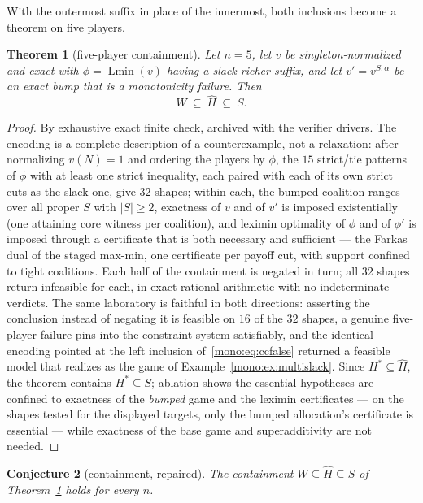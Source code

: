 \documentclass[11pt]{article}
\newtheorem{theorem}{Theorem}
\newtheorem{conjecture}[theorem]{Conjecture}
\newcommand{\Lmin}{\operatorname{Lmin}}
\begin{document}
With the outermost suffix in place of the innermost, both inclusions become
a theorem on five players.

\begin{theorem}[five-player containment]\label{mono:thm:cchat}
Let $n=5$, let $v$ be singleton-normalized and exact with $\phi=\Lmin(v)$
having a slack richer suffix, and let $v'=v^{S,\alpha}$ be an exact bump
that is a monotonicity failure.  Then
\[
 W\ \subseteq\ \widehat H\ \subseteq\ S .
\]
\end{theorem}

\begin{proof}
By exhaustive exact finite check, archived with the verifier drivers.  The
encoding is a complete description of a counterexample, not a relaxation:
after normalizing $v(N)=1$ and ordering the players by $\phi$, the $15$
strict/tie patterns of $\phi$ with at least one strict inequality, each
paired with each of its own strict cuts as the slack one, give $32$
shapes; within each, the bumped coalition ranges over all proper $S$ with
$|S|\ge2$, exactness of $v$ and of $v'$ is imposed existentially (one
attaining core witness per coalition), and leximin optimality of $\phi$
and of $\phi'$ is imposed through a certificate that is both necessary and
sufficient --- the Farkas dual of the staged max-min, one certificate per
payoff cut, with support confined to tight coalitions.  Each half of the
containment is negated in turn; all $32$ shapes return infeasible for
each, in exact rational arithmetic with no indeterminate verdicts.  The
same laboratory is faithful in both directions: asserting the conclusion
instead of negating it is feasible on $16$ of the $32$ shapes, a genuine
five-player failure pins into the constraint system satisfiably, and the
identical encoding pointed at the left inclusion of~\eqref{mono:eq:ccfalse}
returned a feasible model that realizes as the game of
Example~\ref{mono:ex:multislack}.  Since
$H^*\subseteq\widehat H$, the theorem contains $H^*\subseteq S$; ablation
shows the essential hypotheses are confined to exactness of the
\emph{bumped} game and the leximin certificates --- on the shapes tested
for the displayed targets, only the bumped allocation's certificate is
essential --- while exactness of the base game and
superadditivity are not needed.
\end{proof}

\begin{conjecture}[containment, repaired]\label{mono:conj:cc}
The containment $W\subseteq\widehat H\subseteq S$ of
Theorem~\ref{mono:thm:cchat} holds for every $n$.
\end{conjecture}
\end{document}
